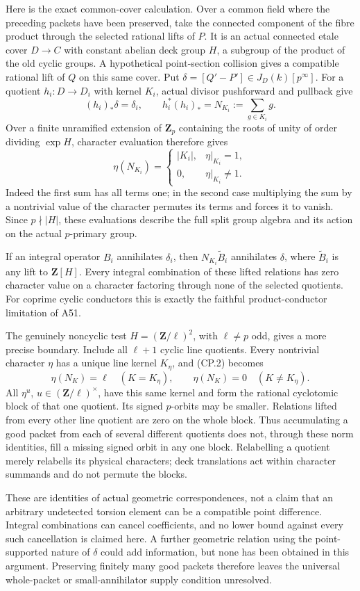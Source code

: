 Here is the exact common-cover calculation. Over a common field
where the preceding packets have been preserved, take the connected
component of the fibre product through the selected rational lifts
of $P$. It is an actual connected etale cover $D\to C$ with
constant abelian deck group $H$, a subgroup of the product of the
old cyclic groups. A hypothetical point-section collision gives a
compatible rational lift of $Q$ on this same cover. Put
$\delta=[Q'-P']\in J_D(k)[p^\infty]$. For a quotient
$h_i:D\to D_i$ with kernel $K_i$, actual divisor pushforward and
pullback give
\[
 (h_i)_*\delta=\delta_i,\qquad
 h_i^*(h_i)_*=N_{K_i}:=\sum_{g\in K_i}g.
\tag{CP.1}
\]
Over a finite unramified extension of $\mathbf Z_p$ containing
the roots of unity of order dividing $\exp H$, character evaluation
therefore gives
\[
 \eta(N_{K_i})=
 \begin{cases}
 |K_i|,&\eta|_{K_i}=1,\\
 0,&\eta|_{K_i}\ne1.
 \end{cases}
\tag{CP.2}
\]
Indeed the first sum has all terms one; in the second case
multiplying the sum by a nontrivial value of the character
permutes its terms and forces it to vanish. Since $p\nmid|H|$,
these evaluations describe the full split group algebra and
its action on the actual $p$-primary group.

If an integral operator $B_i$ annihilates $\delta_i$, then
$N_{K_i}\widetilde B_i$ annihilates $\delta$, where
$\widetilde B_i$ is any lift to $\mathbf Z[H]$.
Every integral combination of these lifted relations has zero
character value on a character factoring through none of the
selected quotients. For coprime cyclic conductors this is exactly
the faithful product-conductor limitation of A51.

The genuinely noncyclic test $H=(\mathbf Z/\ell)^2$, with
$\ell\ne p$ odd, gives a more precise boundary. Include all
$\ell+1$ cyclic line quotients. Every nontrivial character $\eta$
has a unique line kernel $K_\eta$, and (CP.2) becomes
\[
 \eta(N_K)=\ell\quad(K=K_\eta),\qquad
 \eta(N_K)=0\quad(K\ne K_\eta).
\tag{CP.3}
\]
All $\eta^u$, $u\in(\mathbf Z/\ell)^\times$, have this same
kernel and form the rational cyclotomic block of that one
quotient. Its signed $p$-orbits may be smaller. Relations lifted
from every other line quotient are zero on the whole block.
Thus accumulating a good packet from each of several different
quotients does not, through these norm identities, fill a missing
signed orbit in any one block. Relabelling a quotient merely
relabells its physical characters; deck translations act within
character summands and do not permute the blocks.

These are identities of actual geometric correspondences, not a
claim that an arbitrary undetected torsion element can be a
compatible point difference. Integral combinations can cancel
coefficients, and no lower bound against every such cancellation
is claimed here. A further geometric relation using the
point-supported nature of $\delta$ could add information, but
none has been obtained in this argument. Preserving finitely many
good packets therefore leaves the universal whole-packet or
small-annihilator supply condition unresolved.
